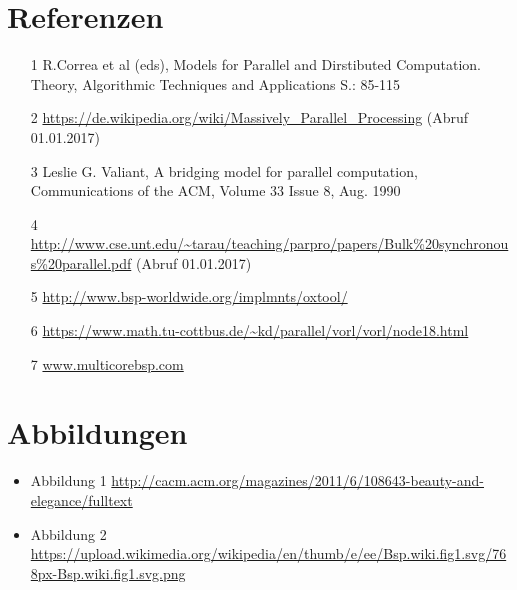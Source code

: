 \documentclass[a4paper,10pt]{scrartcl}
\begin{document}
\section{Referenzen}
\begin{itemize}
\item [1] R.Correa et al (eds), Models for Parallel and Dirstibuted Computation. Theory, Algorithmic Techniques and Applications S.: 85-115
\item [2] \url{https://de.wikipedia.org/wiki/Massively_Parallel_Processing} (Abruf 01.01.2017)
\item [3] Leslie G. Valiant, A bridging model for parallel computation, Communications of the ACM, Volume 33 Issue 8, Aug. 1990 
\item [4] \url{http://www.cse.unt.edu/~tarau/teaching/parpro/papers/Bulk%20synchronous%20parallel.pdf} (Abruf 01.01.2017)
\item [5] \url{http://www.bsp-worldwide.org/implmnts/oxtool/}
\item [6] \url{https://www.math.tu-cottbus.de/~kd/parallel/vorl/vorl/node18.html}
\item [7] \url{www.multicorebsp.com}
\end{itemize}
\section{Abbildungen}
\begin{itemize}
\item Abbildung 1 \url{http://cacm.acm.org/magazines/2011/6/108643-beauty-and-elegance/fulltext}
\item Abbildung 2 \url{https://upload.wikimedia.org/wikipedia/en/thumb/e/ee/Bsp.wiki.fig1.svg/768px-Bsp.wiki.fig1.svg.png}
       
\end{itemize}
\end{document}
